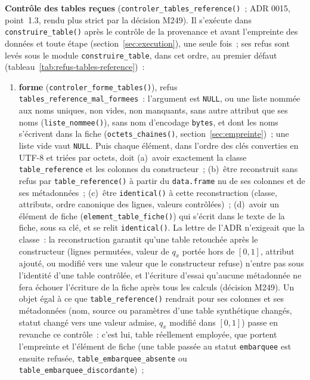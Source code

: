 \documentclass[a4paper,11pt]{article}
\newcommand{\code}[1]{\texttt{\small #1}}
\begin{document}
\medskip
\noindent
\textbf{Contrôle des tables reçues} (\code{controler\_tables\_reference()}~;
ADR 0015, point~1.3, rendu plus strict par la décision M249). Il s'exécute
dans \code{construire\_table()} après le contrôle de la provenance et avant
l'empreinte des données et toute étape (section~\ref{sec:execution}), une
seule fois~; ses refus sont levés sous le module \code{construire\_table},
dans cet ordre, au premier défaut (tableau~\ref{tab:refus-tables-reference})~:
\begin{enumerate}[leftmargin=*, itemsep=2pt]
  \item \textbf{forme} (\code{controler\_forme\_tables()}), refus
    \code{tables\_reference\_mal\_formees}~: l'argument est \code{NULL}, ou
    une liste nommée aux noms uniques, non vides, non manquants, sans autre
    attribut que ses noms (\code{liste\_nommee()}), sans nom d'encodage
    \code{bytes}, et dont les noms s'écrivent dans la fiche
    (\code{octets\_chaines()}, section~\ref{sec:empreinte})~; une liste vide
    vaut \code{NULL}. Puis chaque élément, dans l'ordre des clés converties
    en UTF-8 et triées par octets, doit (a)~avoir exactement la classe
    \code{table\_reference} et les colonnes du constructeur~; (b)~être
    reconstruit sans refus par \code{table\_reference()} à partir du
    \code{data.frame} nu de ses colonnes et de ses métadonnées~; (c)~être
    \code{identical()} à cette reconstruction (classe, attributs, ordre
    canonique des lignes, valeurs contrôlées)~; (d)~avoir un élément de fiche
    (\code{element\_table\_fiche()}) qui s'écrit dans le texte de la fiche,
    sous sa clé, et se relit \code{identical()}. La lettre de l'ADR
    n'exigeait que la classe~: la reconstruction garantit qu'une table
    retouchée après le constructeur (lignes permutées, valeur de $q_x$ portée
    hors de $[0, 1]$, attribut ajouté, ou modifié vers une valeur que le
    constructeur refuse) n'entre pas sous l'identité d'une table contrôlée,
    et l'écriture d'essai qu'aucune métadonnée ne fera échouer l'écriture de
    la fiche après tous les calculs (décision M249). Un objet égal à ce que
    \code{table\_reference()} rendrait pour ses colonnes et ses
    métadonnées (nom, source ou paramètres d'une table synthétique changés,
    statut changé vers une valeur admise, $q_x$ modifié dans $[0, 1]$) passe
    en revanche ce contrôle~: c'est lui, table réellement employée, que
    portent l'empreinte et l'élément de fiche (une table passée au statut
    \code{embarquee} est ensuite refusée, \code{table\_embarquee\_absente}
    ou \code{table\_embarquee\_discordante})~;

\end{enumerate}
\end{document}
